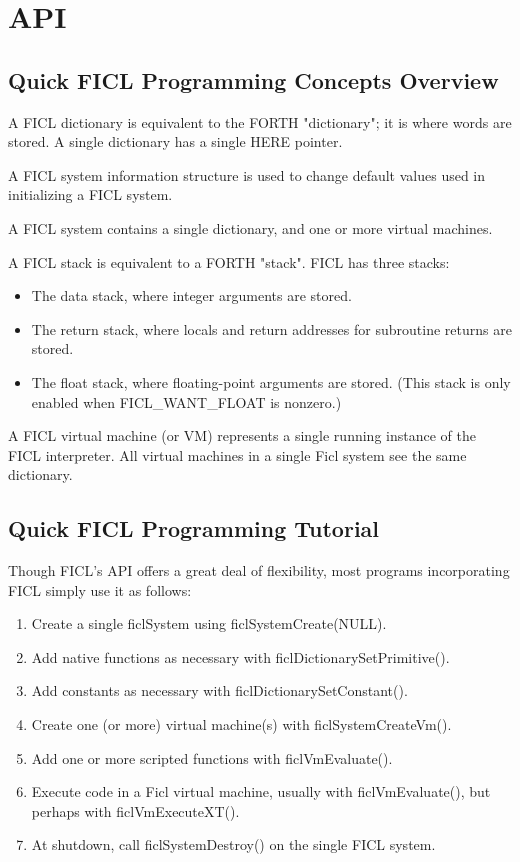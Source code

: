 \chapter{API}
\section{Quick FICL Programming Concepts Overview}
A FICL dictionary is equivalent to the FORTH "dictionary"; it is where
words are stored. A single dictionary has a single HERE pointer.

A FICL system information structure is used to change default values
used in initializing a FICL system.

A FICL system contains a single dictionary, and one or more virtual
machines.

A FICL stack is equivalent to a FORTH "stack". FICL has three stacks:
\begin{itemize}[noitemsep]
	\item The data stack, where integer arguments are stored.
	\item The return stack, where locals and return addresses for
		subroutine returns are stored.
	\item The float stack, where floating-point arguments are
		stored. (This stack is only enabled when
		FICL\_WANT\_FLOAT is nonzero.)
\end{itemize}
A FICL virtual machine (or VM) represents a single running instance of
the FICL interpreter. All virtual machines in a single Ficl system see
the same dictionary.


\section{Quick FICL Programming Tutorial}
Though FICL's API offers a great deal of flexibility, most programs
incorporating FICL simply use it as follows:
\begin{enumerate}[noitemsep]
	\item Create a single ficlSystem using ficlSystemCreate(NULL).
	\item Add native functions as necessary with
		ficlDictionarySetPrimitive().
	\item Add constants as necessary with
		ficlDictionarySetConstant().
	\item Create one (or more) virtual machine(s) with
		ficlSystemCreateVm().
	\item Add one or more scripted functions with ficlVmEvaluate().
	\item Execute code in a Ficl virtual machine, usually with
		ficlVmEvaluate(), but perhaps with ficlVmExecuteXT().
	\item At shutdown, call ficlSystemDestroy() on the single FICL
		system.
\end{enumerate}


